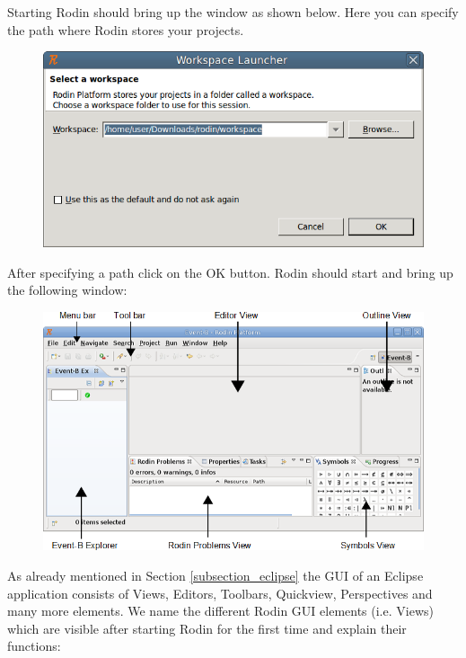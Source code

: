 Starting Rodin should bring up the window as shown below. Here you can specify the path where Rodin stores your projects.

\begin{figure}[!h]
\begin{center}
	\includegraphics{img/tutorial/tut_02_install1.png}
\end{center}
\end{figure}

After specifying a path click on the \textsf{OK} button. Rodin should start and bring up the following window:

\begin{figure}[!h]
\begin{center}
	\includegraphics{img/tutorial/tut_02_install2.png}
\end{center}
\end{figure}

As already mentioned in Section \ref{subsection_eclipse} the GUI of an Eclipse application consists of Views, Editors, Toolbars, Quickview, Perspectives and many more elements. We name the different Rodin GUI elements (i.e. Views) which are visible after starting Rodin for the first time and explain their functions:

